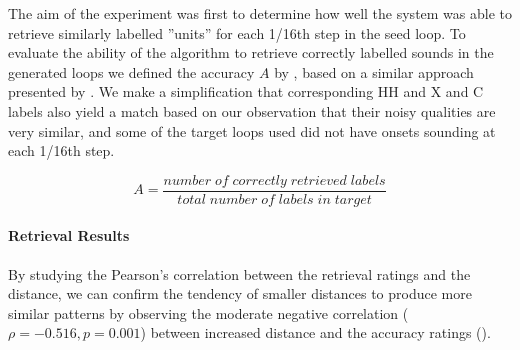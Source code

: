 The aim of the experiment was first to determine how well the system was able to retrieve similarly labelled  ”units” for each 1/16th step in the seed loop. To evaluate the ability of the algorithm to retrieve correctly labelled sounds in the generated loops we defined the accuracy $A$ by , based on a similar approach presented by \cite{Thompson2014}.  We make a simplification that corresponding HH and X and C labels also yield a match based on our observation that their noisy qualities are very similar, and some of the target loops used did not have onsets sounding at each 1/16th step.

\begin{equation}
\label{eq:accuracy}	
A = \frac{number\;of\;correctly\;retrieved\;labels}{total\;number\;of\;labels\;in\;target}
\end{equation}  

\paragraph{Retrieval Results}

By studying the Pearson's correlation between the retrieval ratings and the distance, we can confirm the tendency of smaller distances to produce more similar patterns by observing the moderate negative correlation ($\rho = -0.516, p = 0.001$) between increased distance and the accuracy ratings ().

